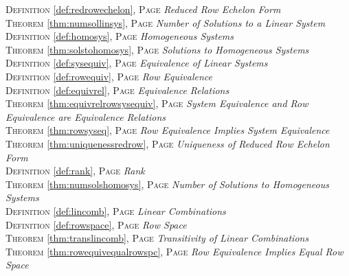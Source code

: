 \begin{multicols}{2}
{\textsc{Definition} \ref{def:redrowechelon}, \textsc{Page} \pageref{def:redrowechelon} \textit{Reduced Row Echelon Form} \\
\textsc{Theorem} \ref{thm:numsollinsys}, \textsc{Page} \pageref{thm:numsollinsys} \textit{Number of Solutions to a Linear System} \\
\textsc{Definition} \ref{def:homosys}, \textsc{Page} \pageref{def:homosys} \textit{Homogeneous Systems} \\
\textsc{Theorem} \ref{thm:solstohomosys}, \textsc{Page} \pageref{thm:solstohomosys} \textit{Solutions to Homogeneous Systems} \\
\textsc{Definition} \ref{def:sysequiv}, \textsc{Page} \pageref{def:sysequiv} \textit{Equivalence of Linear Systems} \\
\textsc{Definition} \ref{def:rowequiv}, \textsc{Page} \pageref{def:rowequiv} \textit{Row Equivalence} \\
\textsc{Definition} \ref{def:equivrel}, \textsc{Page} \pageref{def:equivrel} \textit{Equivalence Relations} \\
\textsc{Theorem} \ref{thm:equivrelrowsysequiv}, \textsc{Page} \pageref{thm:equivrelrowsysequiv} \textit{System Equivalence and Row Equivalence are Equivalence Relations} \\
\textsc{Theorem} \ref{thm:rowsyseq}, \textsc{Page} \pageref{thm:rowsyseq} \textit{Row Equivalence Implies System Equivalence} \\
\textsc{Theorem} \ref{thm:uniquenessredrow}, \textsc{Page} \pageref{thm:uniquenessredrow} \textit{Uniqueness of Reduced Row Echelon Form} \\
\textsc{Definition} \ref{def:rank}, \textsc{Page} \pageref{def:rank} \textit{Rank} \\
\textsc{Theorem} \ref{thm:numsolshomosys}, \textsc{Page} \pageref{thm:numsolshomosys} \textit{Number of Solutions to Homogeneous Systems} \\
\textsc{Definition} \ref{def:lincomb}, \textsc{Page} \pageref{def:lincomb} \textit{Linear Combinations} \\
\textsc{Definition} \ref{def:rowspace}, \textsc{Page} \pageref{def:rowspace} \textit{Row Space} \\
\textsc{Theorem} \ref{thm:translincomb}, \textsc{Page} \pageref{thm:translincomb} \textit{Transitivity of Linear Combinations} \\
\textsc{Theorem} \ref{thm:rowequivequalrowspc}, \textsc{Page} \pageref{thm:rowequivequalrowspc} \textit{Row Equivalence Implies Equal Row Space} \\
}
\end{multicols}
